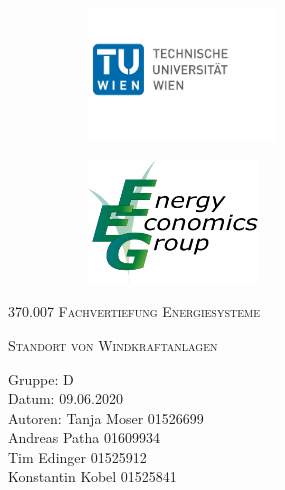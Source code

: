 \documentclass[a4paper,12pt]{article}
\begin{document}
	\begin{titlepage}
		\begin{figure}[h]
			\begin{subfigure}{1cm}
				\includegraphics[width=5cm]{img/TU_Logo}
			\end{subfigure}
			\hspace{10cm}
			\begin{subfigure}{6cm}
				\includegraphics[width=4.5cm]{img/EEG_logo}
			\end{subfigure}
		\end{figure}
		\centering
		\bigskip \bigskip \bigskip \bigskip \bigskip
		\scshape\LARGE 370.007 Fachvertiefung Energiesysteme\par
		\vspace{1cm}
		\scshape\Large Standort von Windkraftanlagen \par
		\vspace{8cm}
		\raggedright
		\large Gruppe: D \\
		Datum: 09.06.2020 \\
		Autoren: Tanja Moser 01526699\\
		\hspace{2.4cm} Andreas Patha 01609934\\
		\hspace{2.4cm} Tim Edinger 01525912\\
		\hspace{2.4cm} Konstantin Kobel 01525841\\
		\vfill
		\large \par
	\end{titlepage}
\end{document}
